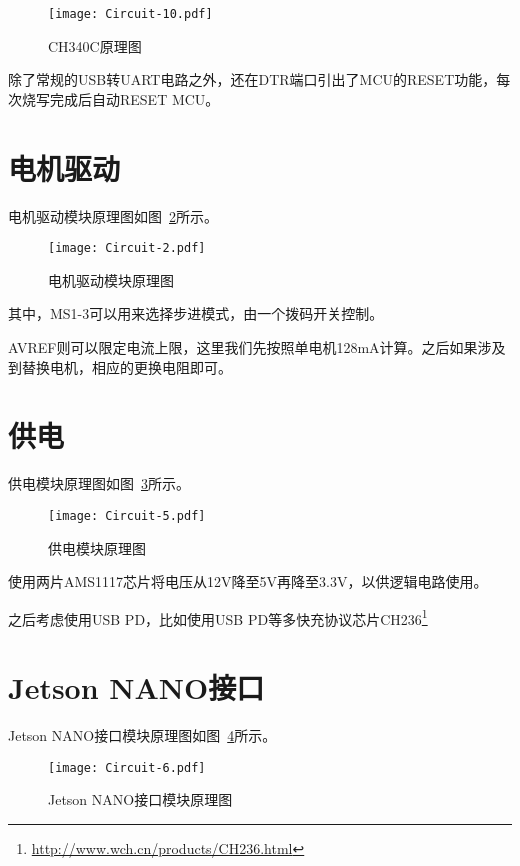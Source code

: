 \begin{figure}[htbp]
    \centering
    \texttt{[image: Circuit-10.pdf]}
    \caption{CH340C原理图}
    \label{fig:Circuit-10}
\end{figure}

除了常规的USB转UART电路之外，还在DTR端口引出了MCU的RESET功能，每次烧写完成后自动RESET MCU。

\section{电机驱动}

电机驱动模块原理图如图~\ref{fig:Circuit-2}所示。

\begin{figure}[htbp]
    \centering
    \texttt{[image: Circuit-2.pdf]}
    \caption{电机驱动模块原理图}
    \label{fig:Circuit-2}
\end{figure}

其中，MS1-3可以用来选择步进模式，由一个拨码开关控制。

AVREF则可以限定电流上限，这里我们先按照单电机128mA计算。之后如果涉及到替换电机，相应的更换电阻即可。

\section{供电}

供电模块原理图如图~\ref{fig:Circuit-5}所示。

\begin{figure}[htbp]
    \centering
    \texttt{[image: Circuit-5.pdf]}
    \caption{供电模块原理图}
    \label{fig:Circuit-5}
\end{figure}

使用两片AMS1117芯片将电压从12V降至5V再降至3.3V，以供逻辑电路使用。

之后考虑使用USB PD，比如使用USB PD等多快充协议芯片CH236\footnote{\url{http://www.wch.cn/products/CH236.html}}

\section{Jetson NANO接口}

Jetson NANO接口模块原理图如图~\ref{fig:Circuit-6}所示。

\begin{figure}[htbp]
    \centering
    \texttt{[image: Circuit-6.pdf]}
    \caption{Jetson NANO接口模块原理图}
    \label{fig:Circuit-6}
\end{figure}

